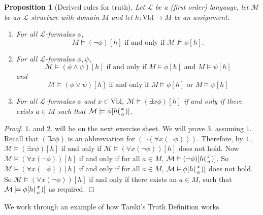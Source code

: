 \documentclass[11pt]{article}
\newcommand{\Vbl}{\textrm{Vbl}}
\newtheorem{proposition}[theorem]{Proposition}
\newcommand{\mcal}[1]{\mathcal{#1}}
\begin{document}
\begin{proposition}[Derived rules for truth]
Let $\mcal{L}$ be a (first order) language, let $\mcal{M}$ be an $\mcal{L}$-structure with domain $M$ and let $h:\Vbl\rightarrow M$ be an assignment.
\begin{enumerate}
\item For all $\mcal{L}$-formulas $\phi$,
\[M\models (\neg\phi)[h] \text{ if and only if } \mcal{M}\nvDash \phi[h].\]
\item For all $\mcal{L}$-formulas $\phi,\psi$,
\[\mcal{M}\models (\phi\wedge \psi)[h] \text{ if and only if }M\models \phi[h] \text{ and }M\models \psi[h]\]
and
\[\mcal{M}\models (\phi\vee \psi)[h] \text{ if and only if }M\models \phi[h] \text{ or }M\models \psi[h]\]
\item For all $\mcal{L}$-formulas $\phi$ and $x\in \Vbl$, $\mcal{M}\models (\exists x\phi)[h]$ if and only if there exists $a\in M$ such that $\mcal{M}\models\phi[h({x\atop a})]$.
\end{enumerate}
\end{proposition}

\begin{proof}
1. and 2. will be on the next exercise sheet. We will prove $3.$ assuming $1.$ Recall that $(\exists x \phi)$ is an abbreviation for $(\neg(\forall x(\neg \phi)))$.
Therefore, by $1.$, $\mcal{M}\models (\exists x\phi)[h]$ if and only if $\mcal{M}\vDash (\forall x(\neg \phi))[h]$ does not hold.
Now $\mcal{M}\vDash(\forall x(\neg \phi))[h]$ if and only if for all $a\in M$, $\mcal{M}\vDash (\neg \phi)[h({x\atop a})]$.
So $\mcal{M}\vDash(\forall x(\neg \phi))[h]$ if and only if for all $a\in M$, $\mcal{M}\vDash \phi[h({x\atop a})]$ does not hold.
So $\mcal{M}\vDash(\forall x(\neg \phi))[h]$ if and only if there exists an $a\in M$, such that $\mcal{M}\models \phi[h({x \atop a})]$ as required.
\end{proof}

We work through an example of how Tarski's Truth Definition works.
\end{document}
